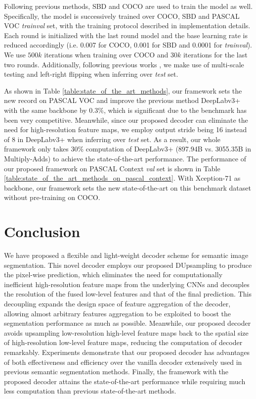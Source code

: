\documentclass[10pt,twocolumn,letterpaper]{article}
\newcommand{\1}{{\mathbbm{1}}}
\begin{document}
Following previous methods, SBD \cite{hariharan2011semantic} and COCO \cite{lin2014microsoft} are used to train the model as well. Specifically, the model is successively trained over COCO, SBD and PASCAL VOC {\it trainval} set, with the training protocol described in implementation details. Each round is initialized with the last round model and the base learning rate is reduced accordingly (i.e. 0.007 for COCO, 0.001 for SBD and 0.0001 for {\it trainval}). We use $500k$ iterations when training over COCO and $30k$ iterations for the last two rounds. Additionally, following previous works \cite{chen2017rethinking, chen2018encoder}, we make use of multi-scale testing and left-right flipping when inferring over {\it test} set.

As shown in Table \ref{table:state_of_the_art_methods}, our framework sets the new record on PASCAL VOC and improve the previous method DeepLabv3+ with the same backbone by 0.3\%, which is significant due to the benchmark has been very competitive. Meanwhile, since our proposed decoder can eliminate the need for high-resolution feature maps, we employ output stride being 16 instead of 8 in DeepLabv3+ when inferring over {\it test} set. As a result, our whole framework only takes 30\% computation of DeepLabv3+ (897.94B vs. 3055.35B in Multiply-Adds) to achieve the state-of-the-art performance. The performance of our proposed framework on PASCAL Context {\it val} set is shown in Table \ref{table:state_of_the_art_methods_on_pascal_context}. With Xception-71 as backbone, our framework sets the new state-of-the-art on this benchmark dataset without pre-training on COCO.

\section{Conclusion}
We have proposed a flexible and light-weight decoder scheme for semantic image segmentation. This novel decoder employs our proposed DUpsampling to produce the pixel-wise prediction, which eliminates the need for computationally inefficient high-resolution feature maps from the underlying CNNs and decouples the resolution of the fused low-level features and that of the final prediction. This decoupling expands the design space of feature aggregation of the decoder, allowing almost arbitrary features aggregation to be exploited to boost the segmentation performance as much as possible. Meanwhile, our proposed decoder avoids upsampling low-resolution high-level feature maps back to the spatial size of high-resolution low-level feature maps, reducing the computation of decoder remarkably. Experiments demonstrate that our proposed decoder has advantages of both effectiveness and efficiency over the vanilla decoder extensively used in previous semantic segmentation methods. Finally, the framework with the proposed decoder attains the state-of-the-art performance while requiring much less computation than previous state-of-the-art methods.
\end{document}
